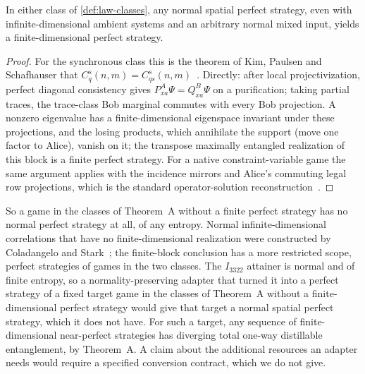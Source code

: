 \begin{remark}\label{prop:normal-perfect}
In either class of \cref{def:law-classes}, any normal spatial perfect strategy, even with infinite-dimensional ambient systems and an
arbitrary normal mixed input, yields a finite-dimensional perfect strategy.
\end{remark}

\begin{proof}
For the synchronous class this is the theorem of Kim, Paulsen and Schafhauser that $C^s_q(n,m)=C^s_{qs}(n,m)$~\cite[Theorem~3.10 and
Corollary~3.11]{KPS18}. Directly: after local projectivization, perfect diagonal consistency gives $P^A_{xa}\Psi=Q^B_{xa}\Psi$ on a
purification; taking partial traces, the trace-class Bob marginal commutes with every Bob projection. A nonzero eigenvalue has a
finite-dimensional eigenspace invariant under these projections, and the losing products, which annihilate the support (move one
factor to Alice), vanish on it; the transpose maximally entangled realization of this block is a finite perfect strategy. For a
native constraint-variable game the same argument applies with the incidence mirrors and Alice's commuting legal row
projections, which is the standard operator-solution reconstruction~\cite{CM14}.
\end{proof}

So a game in the classes of Theorem~A without a finite perfect strategy has no normal perfect strategy at all, of any entropy.
Normal infinite-dimensional correlations that have no finite-dimensional realization were constructed by Coladangelo and
Stark~\cite{CoSt20}; the finite-block conclusion has a more restricted scope, perfect strategies of games in the two classes.
The $I_{3322}$ attainer is normal and of finite entropy, so a normality-preserving adapter that turned it into a perfect strategy
of a fixed target game in the classes of Theorem~A without a finite-dimensional perfect strategy would give that target a normal
spatial perfect strategy, which it does not have. For such a target, any sequence of finite-dimensional near-perfect strategies has
diverging total one-way distillable entanglement, by Theorem~A. A claim about the additional resources an adapter needs would
require a specified conversion contract, which we do not give.
